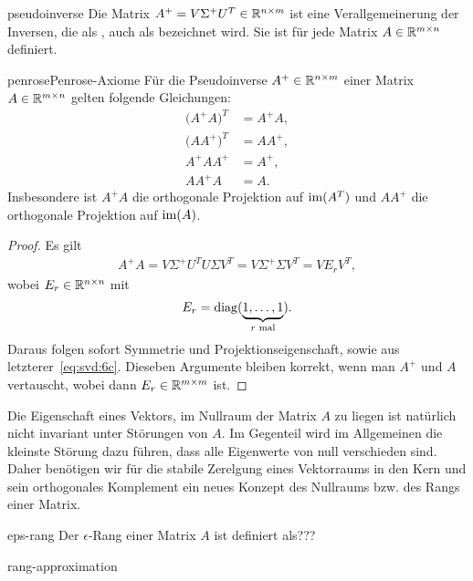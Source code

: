 \begin{Definition}{pseudoinverse}
  Die Matrix $A^+ = V\Sigma^+ U^T \in \mathbb R^{n\times m}$ ist eine
  Verallgemeinerung der Inversen, die als , auch
  als  bezeichnet wird. Sie ist für jede
  Matrix $A\in \mathbb R^{m\times n}$ definiert.
\end{Definition}

\begin{Satz*}{penrose}{Penrose-Axiome}
  Für die Pseudoinverse $A^+\in \mathbb R^{n\times m}$ einer Matrix
  $A\in \mathbb R^{m\times n}$ gelten folgende Gleichungen:
  \begin{align}
    \bigl(A^+A\bigr)^T &= A^+A,\\
    \bigl(AA^+\bigr)^T &= AA^+,\\
    \label{eq:svd:6c}
    A^+AA^+ &= A^+,\\
    AA^+A &= A.
  \end{align}
  Insbesondere ist $A^+A$ die orthogonale Projektion auf $\operatorname{im}(A^T)$
  und $AA^+$ die orthogonale Projektion auf $\operatorname{im}(A)$.
\end{Satz*}

\begin{proof}
  Es gilt
  \begin{gather}
    A^+A = V\Sigma^+U^T U \Sigma V^T = V \Sigma^+\Sigma V^T = V E_r V^T,
  \end{gather}
  wobei $E_r\in \mathbb R^{n\times n}$ mit
  \begin{gather}
    E_r = \operatorname{diag}(\underbrace{1,\dots,1}_{r \text{ mal}}).
  \end{gather}
  Daraus folgen sofort Symmetrie und Projektionseigenschaft, sowie aus
  letzterer~\eqref{eq:svd:6c}. Dieseben Argumente bleiben korrekt,
  wenn man $A^+$ und $A$ vertauscht, wobei dann
  $E_r\in \mathbb R^{m\times m}$ ist.
\end{proof}

\begin{remark}
  Die Eigenschaft eines Vektors, im Nullraum der Matrix $A$ zu liegen
  ist natürlich nicht invariant unter Störungen von $A$. Im Gegenteil
  wird im Allgemeinen die kleinste Störung dazu führen, dass alle
  Eigenwerte von null verschieden sind. Daher benötigen wir für die
  stabile Zerelgung eines Vektorraums in den Kern und sein
  orthogonales Komplement ein neues Konzept des Nullraums bzw. des
  Rangs einer Matrix.
\end{remark}

\begin{Definition}{eps-rang}
  Der $\epsilon$-Rang einer Matrix $A$ ist definiert als???
\end{Definition}

\begin{Satz}{rang-approximation}
  
\end{Satz}

